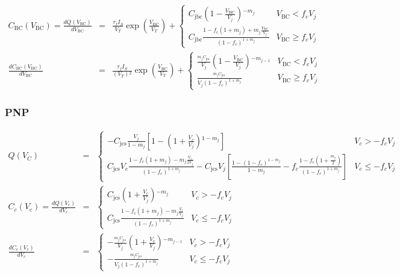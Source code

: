 \documentclass{article}
\begin{document}
\begin{eqnarray*}
C_{\text{BC}}\left(V_{\text{BC}}\right)=
\frac{dQ\left(V_{\text{BC}}\right)}{dV_{\text{BC}}} & = &
\frac{\tau _fI_S}{V_T}\exp \left(\frac{V_{\text{BC}}}{V_T}\right)+\begin{cases}
 C_{\text{jbc}}\left(1-\frac{V_{\text{BC}}}{V_j}\right){}^{-m_j} & V_{\text{BC}}<f_cV_j \\
 C_{\text{jbc}}\frac{1-f_c\left(1+m_j\right)+m_j\frac{V_{\text{BC}}}{V_j}}{\left(1-f_c\right){}^{1+m_j}} & V_{\text{BC}}\geq f_cV_j
\end{cases}\\
\frac{dC_{\text{BC}}\left(V_{\text{BC}}\right)}{dV_{\text{BC}}} & = &
\frac{\tau _fI_S}{\left(V_T\right){}^2}\exp \left(\frac{V_{\text{BC}}}{V_T}\right)+\begin{cases}
 \frac{\text{}_{m_jC_{\text{jbc}}}}{V_j}\left(1-\frac{V_{\text{BC}}}{V_j}\right){}^{-m_{j-1}} & V_{\text{BC}}<f_cV_j \\
 \frac{\text{}_{m_jC_{\text{jbc}}}}{V_j\left(1-f_c\right){}^{1+m_j}} & V_{\text{BC}}\geq f_cV_j
\end{cases}
\end{eqnarray*}

\subsubsection{PNP}
\begin{eqnarray*}
Q\left(V_C\right) & = &\begin{cases}
  -C_{\text{jcs}}\frac{V_j}{1-m_j}\left[1-\left(1+\frac{V_c}{V_j}\right){}^{1-m_j}\right] & V_c>-f_cV_j \\
 C_{\text{jcs}}V_c\frac{1-f_c\left(1+m_j\right)-m_j\frac{V_c}{2V_j}}
 {\left(1-f_c\right){}^{1+m_j}}-C_{\text{jcs}}V_j\left[\frac{1-\left(1-f_c\right){}^{1-m_j}}{1-m_j}-f_c\frac{1-f_c\left(1+\frac{m_j}{2}\right)}{\left(1-f_c\right){}^{1+m_j}}\right] & V_c\leq -f_cV_j
\end{cases}\\
C_c\left(V_c\right)=\frac{dQ\left(V_c\right)}{dV_c}&=&\begin{cases}
 C_{\text{jcs}}\left(1+\frac{V_c}{V_j}\right){}^{-m_j} & V_c>-f_cV_j \\
 C_{\text{jcs}}\frac{1-f_c\left(1+m_j\right)-m_j\frac{V_c}{V_j}}{\left(1-f_c\right){}^{1+m_j}} & V_c\leq -f_cV_j
\end{cases}\\
\frac{dC_c\left(V_c\right)}{dV_c}&=&\begin{cases}
 -\frac{\text{}_{m_jC_{\text{jcs}}}}{V_j}\left(1+\frac{V_c}{V_j}\right){}^{-m_{j-1}} & V_c>-f_cV_j \\
 -\frac{\text{}_{m_jC_{\text{jcs}}}}{V_j\left(1-f_c\right)^{1+m_j}} & V_c\leq -f_cV_j
\end{cases}
\end{eqnarray*}
\end{document}

